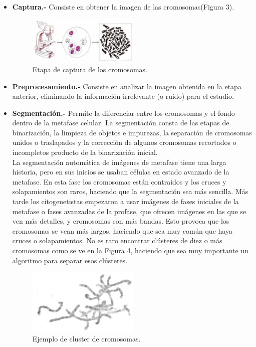 \documentclass[12pt,letterpaper,titlepage]{article}
\begin{document}
\begin{itemize}\itemsep=0pt
\item  \textbf{Captura.-} Consiste en obtener la imagen de las cromosomas(Figura 3).
\begin{figure}
  \centering
    \includegraphics[width=0.5\textwidth]{1_Captura}
  \caption{Etapa de captura de los cromosomas.}
  \label{fig2:EBRP}
\end{figure}

\item  \textbf{Preprocesamiento.-} Consiste en analizar la imagen obtenida en la etapa anterior, eliminando la información irrelevante (o ruido) para el estudio.
\item  \textbf{Segmentación.-} Permite la diferenciar entre los cromosomas y el fondo dentro de la metafase celular. La segmentación consta de las etapas de binarización, la limpieza de objetos e impurezas, la separación de cromosomas unidos o traslapados y la corrección de algunos cromosomas recortados o incompletos producto de la binarización inicial.\\
La segmentación automática de imágenes de metafase tiene una larga historia, pero en sus inicios se usaban células en estado avanzado de la metafase.
En esta fase los cromosomas están contraídos y los cruces y solapamientos son raros, haciendo que la segmentación sea más sencilla. Más tarde los citogenetistas empezaron a usar imágenes de fases iniciales de la metafase o fases avanzadas de la profase, que ofrecen imágenes en las que se ven más detalles, y cromosomas con más bandas. Esto provoca que los cromosomas se vean más largos, haciendo que sea muy común que haya cruces o solapamientos. No es raro encontrar clústeres de diez o más cromosomas como se ve en la Figura 4, haciendo que sea muy importante un algoritmo para separar esos clústeres.\\

\begin{figure}
  \centering
    \includegraphics[width=0.5\textwidth]{4_Segmentacion}
  \caption{Ejemplo de cluster de cromosomas.}
  \label{fig4:Cluster}
\end{figure}


\end{itemize}
\end{document}
